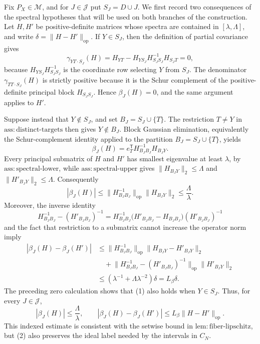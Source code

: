 Fix \(P_X\in\mathcal M\), and for \(J\in\mathcal J\) put \(S_J=D\cup J\).  We first record two consequences of the spectral hypotheses that will be used on both branches of the construction.  Let \(H,H'\) be positive-definite matrices whose spectra are contained in \([\lambda,\Lambda]\), and write \(\delta=\lVert H-H'\rVert_{\mathrm{op}}\).  If \(Y\in S_J\), then the definition of partial covariance gives
\[
 \gamma_{YT\mathbin{\cdot}S_J}(H)
 =H_{YT}-H_{YS_J}H_{S_JS_J}^{-1}H_{S_JT}=0,
\]
because \(H_{YS_J}H_{S_JS_J}^{-1}\) is the coordinate row selecting \(Y\) from \(S_J\).  The denominator \(\gamma_{TT\mathbin{\cdot}S_J}(H)\) is strictly positive because it is the Schur complement of the positive-definite principal block \(H_{S_JS_J}\).  Hence \(\beta_J(H)=0\), and the same argument applies to \(H'\).

Suppose instead that \(Y\notin S_J\), and set \(B_J=S_J\cup\{T\}\).  The restriction \(T\ne Y\) in \(\mathrm{ass:distinct\text{-}targets}\) then gives \(Y\notin B_J\).  Block Gaussian elimination, equivalently the Schur-complement identity applied to the partition \(B_J=S_J\cup\{T\}\), yields
\[
 \beta_J(H)=e_T^{\mathsf T}H_{B_JB_J}^{-1}H_{B_JY}.
\]
Every principal submatrix of \(H\) and \(H'\) has smallest eigenvalue at least \(\lambda\), by \(\mathrm{ass:spectral\text{-}lower}\), while \(\mathrm{ass:spectral\text{-}upper}\) gives \(\lVert H_{B_JY}\rVert_2\le\Lambda\) and \(\lVert H'_{B_JY}\rVert_2\le\Lambda\).  Consequently
\[
 |\beta_J(H)|
 \le \lVert H_{B_JB_J}^{-1}\rVert_{\mathrm{op}}
       \lVert H_{B_JY}\rVert_2
 \le \frac{\Lambda}{\lambda}.
\]
Moreover, the inverse identity
\[
 H_{B_JB_J}^{-1}-(H'_{B_JB_J})^{-1}
 =H_{B_JB_J}^{-1}
   \bigl(H'_{B_JB_J}-H_{B_JB_J}\bigr)
   (H'_{B_JB_J})^{-1}
\]
and the fact that restriction to a submatrix cannot increase the operator norm imply
\[
\begin{aligned}
 |\beta_J(H)-\beta_J(H')|
 &\le \lVert H_{B_JB_J}^{-1}\rVert_{\mathrm{op}}
       \lVert H_{B_JY}-H'_{B_JY}\rVert_2 \\
 &\quad+
       \lVert H_{B_JB_J}^{-1}-(H'_{B_JB_J})^{-1}\rVert_{\mathrm{op}}
       \lVert H'_{B_JY}\rVert_2 \\
 &\le \left(\lambda^{-1}+\Lambda\lambda^{-2}\right)\delta
 =L_\beta\delta .
\end{aligned}
\tag{1}
\]
The preceding zero calculation shows that (1) also holds when \(Y\in S_J\).  Thus, for every \(J\in\mathcal J\),
\[
 |\beta_J(H)|\le\frac{\Lambda}{\lambda},
 \qquad
 |\beta_J(H)-\beta_J(H')|
 \le L_\beta\lVert H-H'\rVert_{\mathrm{op}}.
\tag{2}
\]
This indexed estimate is consistent with the setwise bound in \(\mathrm{lem:fiber\text{-}lipschitz}\), but (2) also preserves the ideal label needed by the intervals in \(C_N\).

